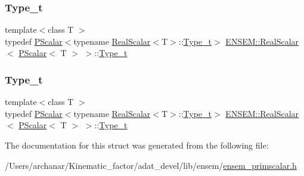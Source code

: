 \subsubsection{\texorpdfstring{Type\_t}{Type\_t}\hspace{0.1cm}{\footnotesize\ttfamily [1/2]}}
{\footnotesize\ttfamily template$<$class T $>$ \\
typedef \mbox{\hyperlink{classENSEM_1_1PScalar}{P\+Scalar}}$<$typename \mbox{\hyperlink{structENSEM_1_1RealScalar}{Real\+Scalar}}$<$T$>$\+::\mbox{\hyperlink{structENSEM_1_1RealScalar_3_01PScalar_3_01T_01_4_01_4_a904a917e492c04b2e0f09ff24b5c6f1c}{Type\+\_\+t}}$>$ \mbox{\hyperlink{structENSEM_1_1RealScalar}{E\+N\+S\+E\+M\+::\+Real\+Scalar}}$<$ \mbox{\hyperlink{classENSEM_1_1PScalar}{P\+Scalar}}$<$ T $>$ $>$\+::\mbox{\hyperlink{structENSEM_1_1RealScalar_3_01PScalar_3_01T_01_4_01_4_a904a917e492c04b2e0f09ff24b5c6f1c}{Type\+\_\+t}}}

\mbox{\label{structENSEM_1_1RealScalar_3_01PScalar_3_01T_01_4_01_4_a904a917e492c04b2e0f09ff24b5c6f1c}} 
\subsubsection{\texorpdfstring{Type\_t}{Type\_t}\hspace{0.1cm}{\footnotesize\ttfamily [2/2]}}
{\footnotesize\ttfamily template$<$class T $>$ \\
typedef \mbox{\hyperlink{classENSEM_1_1PScalar}{P\+Scalar}}$<$typename \mbox{\hyperlink{structENSEM_1_1RealScalar}{Real\+Scalar}}$<$T$>$\+::\mbox{\hyperlink{structENSEM_1_1RealScalar_3_01PScalar_3_01T_01_4_01_4_a904a917e492c04b2e0f09ff24b5c6f1c}{Type\+\_\+t}}$>$ \mbox{\hyperlink{structENSEM_1_1RealScalar}{E\+N\+S\+E\+M\+::\+Real\+Scalar}}$<$ \mbox{\hyperlink{classENSEM_1_1PScalar}{P\+Scalar}}$<$ T $>$ $>$\+::\mbox{\hyperlink{structENSEM_1_1RealScalar_3_01PScalar_3_01T_01_4_01_4_a904a917e492c04b2e0f09ff24b5c6f1c}{Type\+\_\+t}}}



The documentation for this struct was generated from the following file\+:\begin{DoxyCompactItemize}
\item 
/\+Users/archanar/\+Kinematic\+\_\+factor/adat\+\_\+devel/lib/ensem/\mbox{\hyperlink{lib_2ensem_2ensem__primscalar_8h}{ensem\+\_\+primscalar.\+h}}\end{DoxyCompactItemize}
